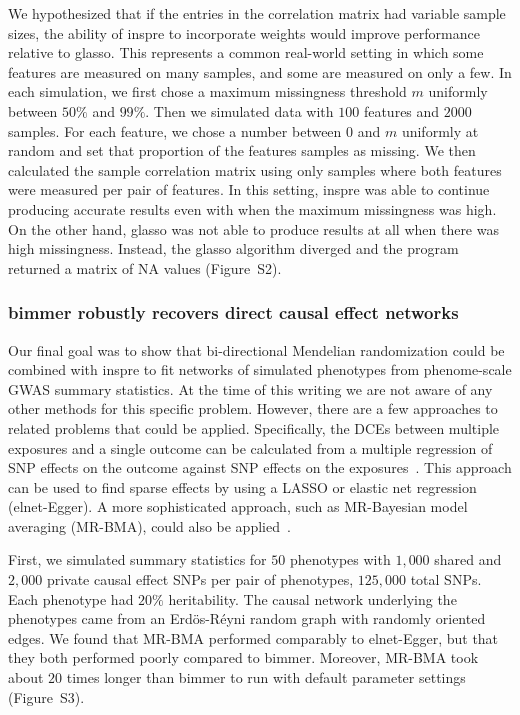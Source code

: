 \documentclass{article}
\begin{document}
We hypothesized that if the entries in the correlation matrix had variable
sample sizes, the ability of inspre to incorporate weights would improve
performance relative to glasso. This represents a common real-world setting in
which some features are measured on many samples, and some are measured
on only a few. In each simulation, we first chose a maximum missingness
threshold $m$ uniformly between $50\%$ and $99\%$. Then we simulated data with
$100$ features and $2000$ samples. For each feature, we chose
a number between $0$ and $m$ uniformly at random and set that proportion of the features
samples as missing. We then calculated the sample correlation matrix using only
samples where both features were measured per pair of features.
In this setting, inspre was able to continue producing accurate
results even with when the maximum missingness was high. On the other
hand, glasso was not able to produce results at all when there was high
missingness. Instead, the glasso algorithm diverged and the program returned
a matrix of NA values (Figure~S2).


\subsubsection*{bimmer robustly recovers direct causal effect networks}

Our final goal was to show that bi-directional Mendelian randomization
could be combined with inspre to fit networks of simulated phenotypes
from phenome-scale GWAS summary statistics. At the time of this writing
we are not aware of any other methods for this specific problem. However,
there are a few approaches to related problems that could be applied.
Specifically, the DCEs between multiple exposures and a single outcome
can be calculated from a multiple regression of SNP effects on the outcome
against SNP effects on the exposures~\cite{Burgess2015a}. This approach can be used
to find sparse effects by using a LASSO or elastic net regression (elnet-Egger). A more
sophisticated approach, such as MR-Bayesian model averaging (MR-BMA), could also be
applied~\cite{Zuber2020}.

First, we simulated summary
statistics for $50$ phenotypes with $1,000$ shared and $2,000$ private
causal effect SNPs per pair of phenotypes, $125,000$ total SNPs. Each
phenotype had $20\%$ heritability. The causal
network underlying the phenotypes came from an Erd\"os-R\'eyni random graph with
randomly oriented edges. We found that MR-BMA performed comparably to
elnet-Egger, but that they both performed poorly compared to bimmer.
Moreover, MR-BMA took about $20$ times longer than bimmer to run with
default parameter settings (Figure~S3).
\end{document}
